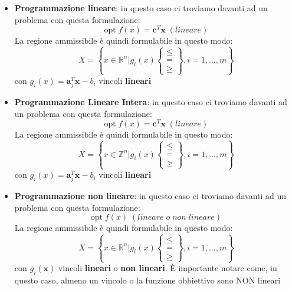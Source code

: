 \documentclass[12pt]{article}
\begin{document}
\begin{itemize}
    \item \textbf{Programmazione lineare}: in questo caso ci troviamo davanti ad un problema con questa formulazione:
    $$\textrm{opt} \; f(x) = \textbf{c}^T \textbf{x} \; (lineare)$$
    La regione ammissibile è quindi formulabile in questo modo:
    $$X = \left \{x \in \mathbb{R}^n \bigg | g_i(x) \begin{Bmatrix} \leq \\ = \\ \geq \end{Bmatrix}, i = 1,...,m \right \}$$
    con $g_i(x) = \textbf{a}_j^T\textbf{x} - b_i$ vincoli \textbf{lineari}
    \item \textbf{Programmazione Lineare Intera}: in questo caso ci troviamo davanti ad un problema con questa formulazione:
    $$\textrm{opt} \; f(x) = \textbf{c}^T \textbf{x} \; (lineare)$$
    La regione ammissibile è quindi formulabile in questo modo:
    $$X = \left \{x \in \mathbb{Z}^n \bigg | g_i(x) \begin{Bmatrix} \leq \\ = \\ \geq \end{Bmatrix}, i = 1,...,m \right \}$$
    con $g_i(x) = \textbf{a}_j^T\textbf{x} - b_i$ vincoli \textbf{lineari}
    \item \textbf{Programmazione non lineare}: in questo caso ci troviamo davanti ad un problema con questa formulazione:
    $$\textrm{opt} \; f(x) \; (lineare \; o \; non \; lineare)$$
    La regione ammissibile è quindi formulabile in questo modo:
    $$X = \left \{x \in \mathbb{R}^n \bigg | g_i(x) \begin{Bmatrix} \leq \\ = \\ \geq \end{Bmatrix}, i = 1,...,m \right \}$$
    con $g_i(\textbf{x})$ vincoli \textbf{lineari} o \textbf{non lineari}. È importante notare come, in questo caso, almeno un vincolo o
    la funzione obbiettivo sono NON lineari
\end{itemize}
\end{document}
